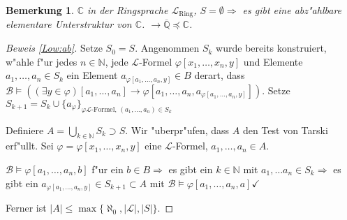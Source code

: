 \documentclass[a4paper,12pt,numbers=noenddot,parskip=full]{scrartcl}
\newcommand{\setN}{\mathbb{N}}
\newcommand{\setQ}{\mathbb{Q}}
\newcommand{\setC}{\mathbb{C}}
\newcommand{\scrL}{\mathcal{L}}
\newcommand{\scrB}{\mathcal{B}}
\theoremstyle{dotless}
\newtheorem{remark}[theorem]{Bemerkung}
\begin{document}
\begin{remark}
	$\setC$ in der Ringsprache $\scrL_\text{Ring}$, $S=\emptyset \Rightarrow$ es gibt eine abz"ahlbare elementare Unterstruktur von $\setC$. $\rightarrow \overline{\setQ} \preceq \setC$.
\end{remark}

\begin{proof}[Beweis \ref{Low:ab}]
	Setze $S_0 = S$. Angenommen $S_k$ wurde bereits konstruiert, w"ahle f"ur jedes $n \in \setN$, jede $\scrL$-Formel $\varphi[x_1, \dots, x_n, y]$ und Elemente $a_1, \dots, a_n \in S_k$ ein Element $a_{\varphi[a_1, \dots, a_n, y]} \in B$ derart, dass $\scrB \models ((\exists y \in \varphi)[a_1, \dots, a_n] \rightarrow \varphi[a_1, \dots, a_n, a_{\varphi[a_1, \dots, a_n, y]}])$. Setze $S_{k+1} = S_k \cup \{a_\varphi\}_{\varphi \scrL \text{-Formel, }(a_1, \dots, a_n)\in S_k}$
	
	Definiere $A = \underset{k \in \setN}{\bigcup} S_k \supset S$. Wir "uberpr"ufen, dass $A$ den Test von Tarski erf"ullt. Sei $\varphi = \varphi[x_1, \dots, x_n, y]$ eine $\scrL$-Formel, $a_1, \dots, a_n \in A$.
	
	$\scrB \models \varphi[a_1, \dots, a_n, b]$ f"ur ein $b \in B \Rightarrow$ es gibt ein $k \in \setN$ mit $a_1, \dots a_n \in S_k \Rightarrow$ es gibt ein $a_{\varphi[a_1, \dots, a_n, y]} \in S_{k+1} \subset A$ mit $\scrB \models \varphi[a_1, \dots, a_n, a] \checkmark$
	
	Ferner ist $|A| \leq \max \{\aleph_0, |\scrL|, |S|\}$.
\end{proof}
\end{document}
